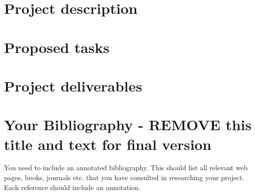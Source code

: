 \documentclass[11pt,fleqn,twoside]{article}
\begin{document}

\mmp



\section{Project description}


\section{Proposed tasks}


\section{Project deliverables}

%
%
\section*{Your Bibliography - REMOVE this title and text for final version}
%
You need to include an annotated bibliography. This should list all relevant web pages, books, journals etc. that you have consulted in researching your project. Each reference should include an annotation.
\end{document}
